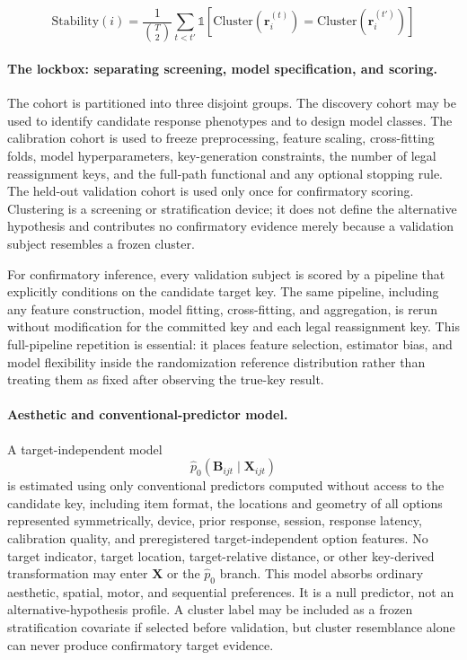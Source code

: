 \documentclass[11pt,letterpaper]{article}
\begin{document}
\begin{equation}
\text{Stability}(i) = \frac{1}{\binom{T}{2}} \sum_{t < t'} \mathbb{1}[\text{Cluster}(\mathbf{r}_i^{(t)}) = \text{Cluster}(\mathbf{r}_i^{(t')})]
\label{eq:stability}
\end{equation}

\paragraph{The lockbox: separating screening, model specification, and scoring.}
\label{sec:lockbox}
The cohort is partitioned into three disjoint groups. The discovery cohort may be used to identify candidate response phenotypes and to design model classes. The calibration cohort is used to freeze preprocessing, feature scaling, cross-fitting folds, model hyperparameters, key-generation constraints, the number of legal reassignment keys, and the full-path functional and any optional stopping rule. The held-out validation cohort is used only once for confirmatory scoring. Clustering is a screening or stratification device; it does not define the alternative hypothesis and contributes no confirmatory evidence merely because a validation subject resembles a frozen cluster.

For confirmatory inference, every validation subject is scored by a pipeline that explicitly conditions on the candidate target key. The same pipeline, including any feature construction, model fitting, cross-fitting, and aggregation, is rerun without modification for the committed key and each legal reassignment key. This full-pipeline repetition is essential: it places feature selection, estimator bias, and model flexibility inside the randomization reference distribution rather than treating them as fixed after observing the true-key result.

\paragraph{Aesthetic and conventional-predictor model.}
\label{sec:aesthetic}
A target-independent model
\begin{equation}
\hat p_0\!\left(\mathbf{B}_{ijt}\mid\mathbf{X}_{ijt}\right)
\label{eq:aesthetic}
\end{equation}
is estimated using only conventional predictors computed without access to the candidate key, including item format, the locations and geometry of all options represented symmetrically, device, prior response, session, response latency, calibration quality, and preregistered target-independent option features. No target indicator, target location, target-relative distance, or other key-derived transformation may enter $\mathbf{X}$ or the $\hat p_0$ branch. This model absorbs ordinary aesthetic, spatial, motor, and sequential preferences. It is a null predictor, not an alternative-hypothesis profile. A cluster label may be included as a frozen stratification covariate if selected before validation, but cluster resemblance alone can never produce confirmatory target evidence.
\end{document}
